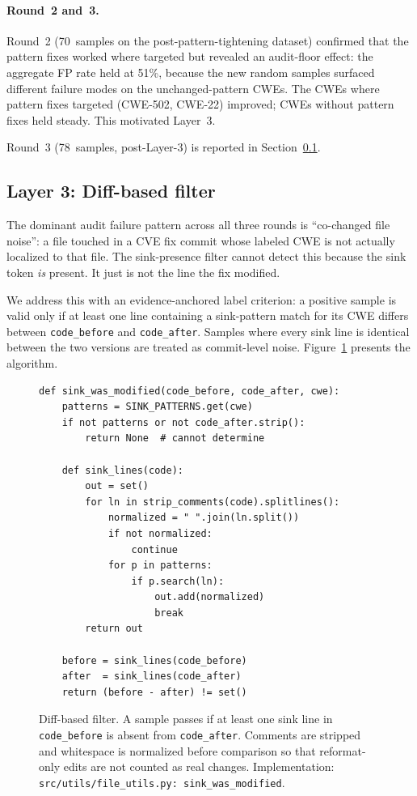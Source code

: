 \paragraph{Round~2 and~3.}
Round~2 (70~samples on the post-pattern-tightening dataset)
confirmed that the pattern fixes worked where targeted but
revealed an audit-floor effect: the aggregate FP rate held at 51\%,
because the new random samples surfaced different failure modes
on the unchanged-pattern CWEs. The CWEs where pattern fixes
targeted (CWE-502, CWE-22) improved; CWEs without pattern fixes
held steady. This motivated Layer~3.

Round~3 (78~samples, post-Layer-3) is reported in
Section~\ref{sec:dataset:diff}.

\subsection{Layer 3: Diff-based filter}
\label{sec:dataset:diff}

The dominant audit failure pattern across all three rounds is
``co-changed file noise'': a file touched in a CVE fix commit
whose labeled CWE is not actually localized to that file. The
sink-presence filter cannot detect this because the sink token
\emph{is} present. It just is not the line the fix modified.

We address this with an evidence-anchored label criterion: a
positive sample is valid only if at least one line containing a
sink-pattern match for its CWE differs between \texttt{code\_before}
and \texttt{code\_after}. Samples where every sink line is
identical between the two versions are treated as commit-level
noise. Figure~\ref{fig:diff-filter} presents the algorithm.

\begin{figure}[h]
\begin{verbatim}
def sink_was_modified(code_before, code_after, cwe):
    patterns = SINK_PATTERNS.get(cwe)
    if not patterns or not code_after.strip():
        return None  # cannot determine

    def sink_lines(code):
        out = set()
        for ln in strip_comments(code).splitlines():
            normalized = " ".join(ln.split())
            if not normalized:
                continue
            for p in patterns:
                if p.search(ln):
                    out.add(normalized)
                    break
        return out

    before = sink_lines(code_before)
    after  = sink_lines(code_after)
    return (before - after) != set()
\end{verbatim}
\caption{Diff-based filter. A sample passes if at least one sink
line in \texttt{code\_before} is absent from \texttt{code\_after}.
Comments are stripped and whitespace is normalized before
comparison so that reformat-only edits are not counted as real
changes. Implementation: \texttt{src/utils/file\_utils.py:
sink\_was\_modified}.}
\label{fig:diff-filter}
\end{figure}

